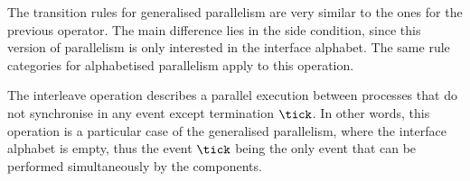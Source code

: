 \begin{prooftree}
\end{prooftree}

\begin{prooftree}
\end{prooftree}

\begin{prooftree}
\end{prooftree}

The transition rules for generalised parallelism are very similar to the ones for the previous operator. The main difference lies in the side condition, since this version of parallelism is only interested in the interface alphabet. The same rule categories for alphabetised parallelism apply to this operation.

\begin{prooftree}
\end{prooftree}

\begin{prooftree}
\end{prooftree}

\begin{prooftree}
\end{prooftree}

The interleave operation describes a parallel execution between processes that do not synchronise in any event except termination $ \tick $. In other words, this operation is a particular case of the generalised parallelism, where the interface alphabet is empty, thus the event $ \tick $ being the only event that can be performed simultaneously by the components.

